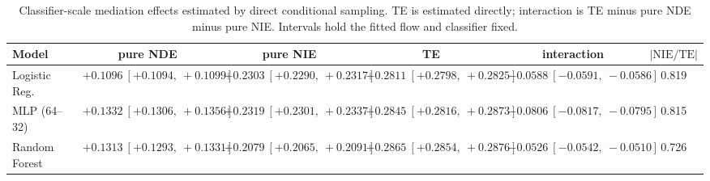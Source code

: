 \begin{table}[htbp]
  \centering
  \caption{Classifier-scale mediation effects estimated by direct conditional sampling. TE is estimated directly; interaction is TE minus pure NDE minus pure NIE. Intervals hold the fitted flow and classifier fixed.}
  \label{tab:bar_gap_overall}
  \begin{tabular}{lccccc}
    \toprule
    Model & pure NDE & pure NIE & TE & interaction & $|\mathrm{NIE}/\mathrm{TE}|$ \\
    \midrule
    Logistic Reg. & $+0.1096\ [+0.1094,\ +0.1099]$ & $+0.2303\ [+0.2290,\ +0.2317]$ & $+0.2811\ [+0.2798,\ +0.2825]$ & $-0.0588\ [-0.0591,\ -0.0586]$ & 0.819 \\
    MLP (64--32) & $+0.1332\ [+0.1306,\ +0.1356]$ & $+0.2319\ [+0.2301,\ +0.2337]$ & $+0.2845\ [+0.2816,\ +0.2873]$ & $-0.0806\ [-0.0817,\ -0.0795]$ & 0.815 \\
    Random Forest & $+0.1313\ [+0.1293,\ +0.1331]$ & $+0.2079\ [+0.2065,\ +0.2091]$ & $+0.2865\ [+0.2854,\ +0.2876]$ & $-0.0526\ [-0.0542,\ -0.0510]$ & 0.726 \\
    \bottomrule
  \end{tabular}
\end{table}